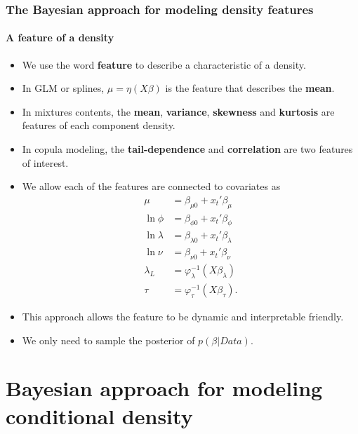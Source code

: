 \documentclass[10pt]{beamer}
\begin{document}
\begin{frame}
  \frametitle{The Bayesian approach for modeling density features}
  \framesubtitle{A feature of a density}

  \begin{itemize}
  \item We use the word \textbf{feature} to describe a characteristic of a
    density.

  \item In GLM or splines, $\mu = \eta (X\beta)$ is the feature that describes the \textbf{mean}.

  \item In mixtures contents, the \textbf{mean}, \textbf{variance},
    \textbf{skewness} and \textbf{kurtosis} are features of each component
    density.

  \item In copula modeling, the \textbf{tail-dependence} and
    \textbf{correlation} are two features of interest.

  \item We allow each of the features are connected to covariates as
    \begin{equation*}
  \begin{split}
    \mu & =  \beta_{\mu0}+x_{t}'\beta_{\mu} \\
    \ln\phi & =  \beta_{\phi0}+x_{t}'\beta_{\phi} \\
    \ln\lambda & =  \beta_{\lambda0}+x_{t}'\beta_{\lambda} \\
    \ln\nu & = \beta_{\nu0}+x_{t}'\beta_{\nu}\\
    \lambda_L & = \varphi_{\lambda}^{-1}(X\beta_\lambda)\\
 \tau &= \varphi_{\tau}^{-1}(X\beta_\tau).
  \end{split}
\end{equation*}

\item This approach allows the feature to be dynamic and interpretable
  friendly.

\item We only need to sample the posterior of $p(\beta|Data)$.

  \end{itemize}

\end{frame}

\section{Bayesian approach for modeling conditional density}
\end{document}
